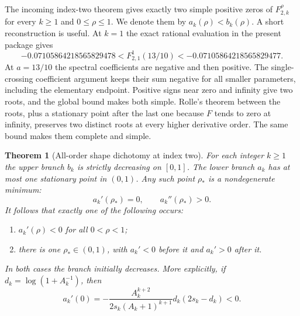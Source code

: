 \documentclass[11pt,a4paper]{article}
\numberwithin{equation}{section}
\newtheorem{theorem}{Theorem}[section]
\theoremstyle{definition}
\theoremstyle{remark}
\begin{document}
The incoming index-two theorem gives exactly two simple positive zeros
of $F_{2,k}^{\rho}$ for every $k\geq1$ and $0\leq\rho\leq1$. We denote
them by $a_k(\rho)<b_k(\rho)$. A short reconstruction is useful. At
$k=1$ the exact rational evaluation in the present package gives
\[
 -0.07105864218565829478
 <F_{2,1}^{1}(13/10)
 <-0.07105864218565829477.
\]
At $a=13/10$ the spectral coefficients are negative and then positive.
The single-crossing coefficient argument keeps their sum negative for
all smaller parameters, including the elementary endpoint. Positive
signs near zero and infinity give two roots, and the global bound makes
both simple. Rolle's theorem between the roots, plus a stationary point
after the last one because $F$ tends to zero at infinity, preserves two
distinct roots at every higher derivative order. The same bound makes
them complete and simple.

\begin{theorem}[All-order shape dichotomy at index two]
\label{lershape:thm:dichotomy}
For each integer $k\geq1$ the upper branch $b_k$ is strictly decreasing
on $[0,1]$. The lower branch $a_k$ has at most one stationary point in
$(0,1)$. Any such point $\rho_*$ is a nondegenerate minimum:
\[
 a_k'(\rho_*)=0,\qquad a_k''(\rho_*)>0.
\]
It follows that exactly one of the following occurs:
\begin{enumerate}
\item $a_k'(\rho)<0$ for all $0<\rho<1$;
\item there is one $\rho_*\in(0,1)$, with $a_k'<0$ before it and
      $a_k'>0$ after it.
\end{enumerate}
In both cases the branch initially decreases. More explicitly, if
$d_k=\log(1+A_k^{-1})$, then
\begin{equation}\label{lershape:eq:initial-velocity}
 a_k'(0)=-\frac{A_k^{k+2}}{2s_k(A_k+1)^{k+1}}
                 d_k(2s_k-d_k)<0.
\end{equation}
\end{theorem}
\end{document}
